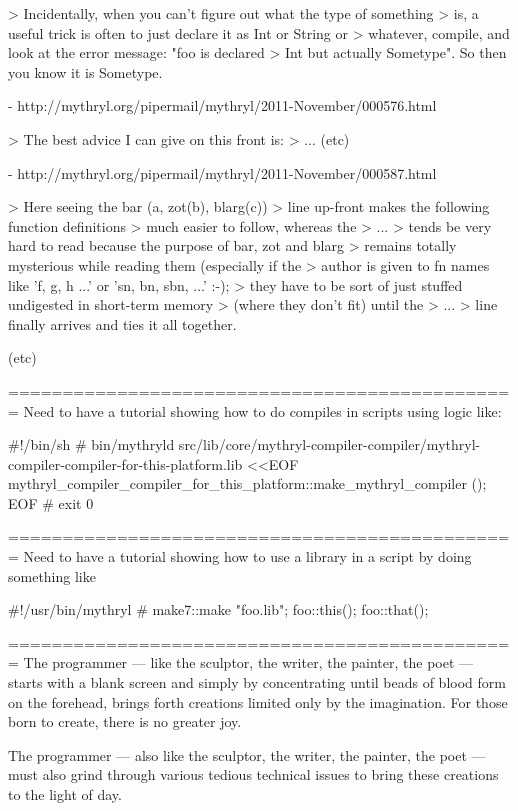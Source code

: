     > Incidentally, when you can't figure out what the type of something 
    > is, a useful trick is often to just declare it as Int or String or 
    > whatever, compile, and look at the error message:  "foo is declared 
    > Int but actually Sometype".  So then you know it is Sometype. 

    - http://mythryl.org/pipermail/mythryl/2011-November/000576.html 

    > The best advice I can give on this front is: 
    > ... (etc) 

    - http://mythryl.org/pipermail/mythryl/2011-November/000587.html 

    > Here seeing the   bar (a, zot(b), blarg(c)) 
    > line up-front makes the following function definitions 
    > much easier to follow, whereas the 
    > ... 
    > tends be very hard to read because the purpose of bar, zot and blarg 
    > remains totally mysterious while reading them (especially if the 
    > author is given to fn names like 'f, g, h ...' or 'sn, bn, sbn, ...' :-); 
    > they have to be sort of just stuffed undigested in short-term memory 
    > (where they don't fit) until the 
    > ... 
    > line finally arrives and ties it all together. 

    (etc) 
 


=============================================== 
Need to have a tutorial showing how to do compiles 
in scripts using logic like:

    #!/bin/sh 
    # 
    bin/mythryld  src/lib/core/mythryl-compiler-compiler/mythryl-compiler-compiler-for-this-platform.lib  <<EOF 
        mythryl_compiler_compiler_for_this_platform::make_mythryl_compiler (); 
    EOF 
    # 
    exit 0 


=============================================== 
Need to have a tutorial showing how to use a library 
in a script by doing something like 

    #!/usr/bin/mythryl 
    # 
    make7::make "foo.lib"; 
    { 
        foo::this(); 
        foo::that(); 
    } 



=============================================== 
The programmer --- like the sculptor, the writer, the painter,
the poet --- starts with a blank screen and simply by concentrating 
until beads of blood form on the forehead, brings forth creations 
limited only by the imagination.  For those born to create, there 
is no greater joy.

The programmer --- also like the sculptor, the writer, the painter,
the poet --- must also grind through various tedious technical issues 
to bring these creations to the light of day.

